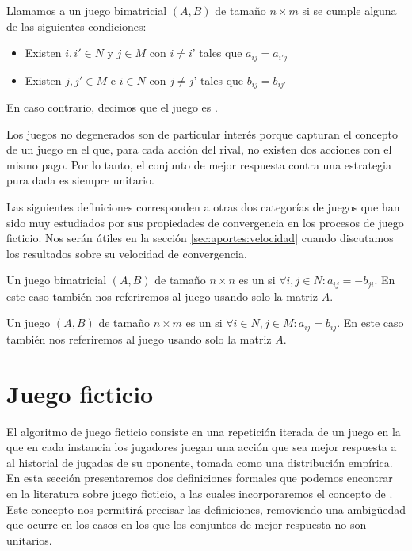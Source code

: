 \begin{definition}
    Llamamos  a un juego bimatricial $(A, B)$ de tamaño $n \times m$ si se cumple alguna de las siguientes condiciones:
    \begin{itemize}
        \item Existen $i, i' \in N$ y $j \in M$ con $i \neq i$' tales que $a_{ij} = a_{i'j}$
        \item Existen $j, j' \in M$ e $i \in N$ con $j \neq j$' tales que $b_{ij} = b_{ij'}$
    \end{itemize}
    En caso contrario, decimos que el juego es .
\end{definition}
Los juegos no degenerados son de particular interés porque capturan el concepto de un juego en el que, para cada acción del rival, no existen dos acciones con el mismo pago. Por lo tanto, el conjunto de mejor respuesta contra una estrategia pura dada es siempre unitario.

Las siguientes definiciones corresponden a otras dos categorías de juegos que han sido muy estudiados por sus propiedades de convergencia en los procesos de juego ficticio. Nos serán útiles en la sección \ref{sec:aportes:velocidad} cuando discutamos los resultados sobre su velocidad de convergencia.

\begin{definition}
    Un juego bimatricial $(A, B)$ de tamaño $n \times n$ es un  si $\forall i, j \in N : a_{ij} = -b_{ji}$. En este caso también nos referiremos al juego usando solo la matriz $A$.
\end{definition}

\begin{definition}
    Un juego $(A, B)$ de tamaño $n \times m$ es un  si $\forall i \in N, j \in M : a_{ij} = b_{ij}$. En este caso también nos referiremos al juego usando solo la matriz $A$.
\end{definition}


\section{Juego ficticio} \label{sec:def:fp}

El algoritmo de juego ficticio consiste en una repetición iterada de un juego en la que en cada instancia los jugadores juegan una acción que sea mejor respuesta a al historial de jugadas de su oponente, tomada como una distribución empírica. En esta sección presentaremos dos definiciones formales que podemos encontrar en la literatura sobre juego ficticio, a las cuales incorporaremos el concepto de . Este concepto nos permitirá precisar las definiciones, removiendo una ambigüedad que ocurre en los casos en los que los conjuntos de mejor respuesta no son unitarios.

